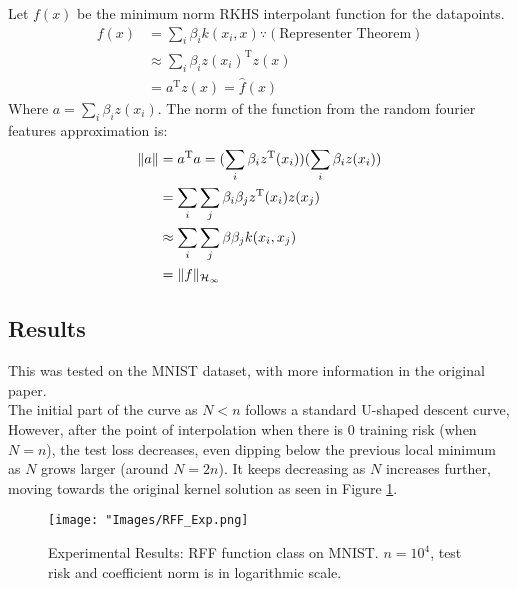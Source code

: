 \documentclass[twoside]{memoir}
\begin{document}
	Let $f(x)$ be the minimum norm RKHS interpolant function for the datapoints. 
	\begin{equation*}
	\begin{split}
	f(x) &= \sum_{i}\beta_ik(x_i, x)  \because(\text{Representer Theorem}) \\
	&\approx \sum_{i}\beta_iz(x_i)^\text{T}z(x) \\
	&= a^\text{T}z(x) = \hat{f}(x)
	\end{split}
	\end{equation*}
	Where $a = \sum_{i}\beta_iz(x_i) $.
	The norm of the function from the random fourier features approximation is:
	\begin{equation*}
	\begin{split}
	\lVert a\rVert &=   a^\text{T} a = 
	(\sum_{i}\beta_i z^\text{T}(x_i)) (\sum_{i}\beta_i z(x_i)) \\
	&= \sum_i \sum_j \beta_i \beta_j z^\text{T}(x_i)z(x_j)  \\
	&\approx \sum_i \sum_j \beta \beta_j k(x_i, x_j) \\
	&= \lVert f\rVert_{\mathcal{H}_\infty}
	\end{split}
	\end{equation*}

\subsection{Results}
This was tested on the MNIST dataset, with more information in the original paper.\\
The initial part of the curve as $N < n$ follows a standard U-shaped descent curve, However, after the point of interpolation when there is 0 training risk (when $N = n$), the test loss decreases, even dipping below the previous local minimum as $N$ grows larger (around $N = 2n$). It keeps decreasing as $N$ increases further, moving towards the original kernel solution as seen in Figure \ref{fig:RFF_Exp}.

\begin{figure}
	\centering
	\texttt{[image: "Images/RFF\_Exp.png]}
	\par
	\caption{Experimental Results: RFF function class on MNIST. $n=10^4$, test risk and coefficient norm is in logarithmic scale.} \label{fig:RFF_Exp}
\end{figure}
\end{document}
